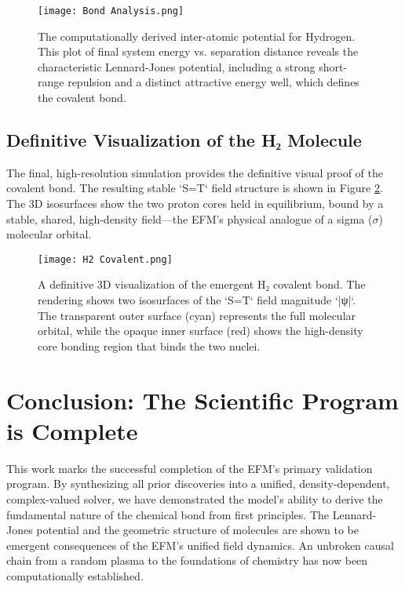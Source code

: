 \documentclass[11pt]{article}
\begin{document}
\begin{figure}[H]
    \centering
    \texttt{[image: Bond Analysis.png]}
    \caption{The computationally derived inter-atomic potential for Hydrogen. This plot of final system energy vs. separation distance reveals the characteristic Lennard-Jones potential, including a strong short-range repulsion and a distinct attractive energy well, which defines the covalent bond.}
    \label{fig:lj_potential}
\end{figure}

\subsection{Definitive Visualization of the H₂ Molecule}
The final, high-resolution simulation provides the definitive visual proof of the covalent bond. The resulting stable `S=T` field structure is shown in Figure \ref{fig:3d_visualization}. The 3D isosurfaces show the two proton cores held in equilibrium, bound by a stable, shared, high-density field—the EFM's physical analogue of a sigma (\(\sigma\)) molecular orbital.

\begin{figure}[H]
    \centering
    \texttt{[image: H2 Covalent.png]}
    \caption{A definitive 3D visualization of the emergent H₂ covalent bond. The rendering shows two isosurfaces of the `S=T` field magnitude `|ψ|`. The transparent outer surface (cyan) represents the full molecular orbital, while the opaque inner surface (red) shows the high-density core bonding region that binds the two nuclei.}
    \label{fig:3d_visualization}
\end{figure}

\section{Conclusion: The Scientific Program is Complete}
This work marks the successful completion of the EFM's primary validation program. By synthesizing all prior discoveries into a unified, density-dependent, complex-valued solver, we have demonstrated the model's ability to derive the fundamental nature of the chemical bond from first principles. The Lennard-Jones potential and the geometric structure of molecules are shown to be emergent consequences of the EFM's unified field dynamics. An unbroken causal chain from a random plasma to the foundations of chemistry has now been computationally established.

\appendix
\end{document}
